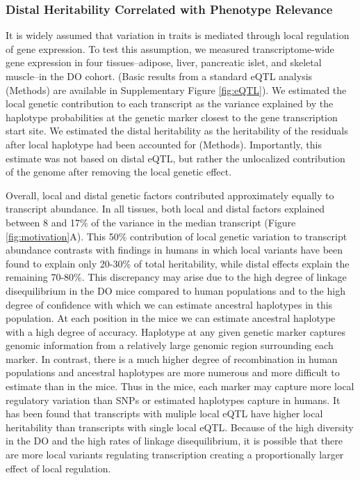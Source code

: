 \documentclass[
]{article}
\begin{document}
\subsubsection{Distal Heritability Correlated with Phenotype
Relevance}\label{distal-heritability-correlated-with-phenotype-relevance}

It is widely assumed that variation in traits is mediated through local
regulation of gene expression. To test this assumption, we measured
transcriptome-wide gene expression in four tissues--adipose, liver,
pancreatic islet, and skeletal muscle--in the DO cohort. (Basic results
from a standard eQTL analysis \cite{pmid30591514} (Methods) are
available in Supplementary Figure \ref{fig:eQTL}). We estimated the
local genetic contribution to each transcript as the variance explained
by the haplotype probabilities at the genetic marker closest to the gene
transcription start site. We estimated the distal heritability as the
heritability of the residuals after local haplotype had been accounted
for (Methods). Importantly, this estimate was not based on distal eQTL,
but rather the unlocalized contribution of the genome after removing the
local genetic effect.

Overall, local and distal genetic factors contributed approximately
equally to transcript abundance. In all tissues, both local and distal
factors explained between 8 and 17\% of the variance in the median
transcript (Figure \ref{fig:motivation}A). This 50\% contribution of
local genetic variation to transcript abundance contrasts with findings
in humans in which local variants have been found to explain only
20-30\% of total heritability, while distal effects explain the
remaining 70-80\%\cite{pmid31558840, pmid21383966}. This discrepancy may
arise due to the high degree of linkage disequilibrium in the DO mice
compared to human populations and to the high degree of confidence with
which we can estimate ancestral haplotypes in this population. At each
position in the mice we can estimate ancestral haplotype with a high
degree of accuracy. Haplotype at any given genetic marker captures
genomic information from a relatively large genomic region surrounding
each marker. In contrast, there is a much higher degree of recombination
in human populations and ancestral haplotypes are more numerous and more
difficult to estimate than in the mice. Thus in the mice, each marker
may capture more local regulatory variation than SNPs or estimated
haplotypes capture in humans. It has been found that transcripts with
muliple local eQTL have higher local heritability than transcripts with
single local eQTL\cite{pmid25010687}. Because of the high diversity in
the DO and the high rates of linkage disequilibrium, it is possible that
there are more local variants regulating transcription creating a
proportionally larger effect of local regulation.
\end{document}
